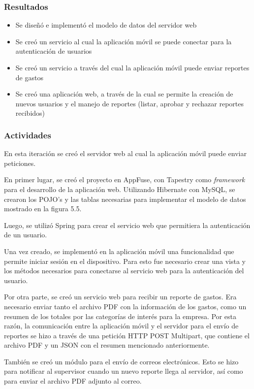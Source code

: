 \subsubsection{Resultados}
\begin{itemize}
\item Se diseñó e implementó el modelo de datos del servidor web
\item Se creó un servicio al cual la aplicación móvil se puede conectar para la autenticación de usuarios
\item Se creó un servicio a través del cual la aplicación móvil puede enviar reportes de gastos
\item Se creó una aplicación web, a través de la cual se permite la creación de nuevos usuarios y el manejo de reportes (listar, aprobar y rechazar reportes recibidos)
\end{itemize}

\subsubsection{Actividades}

En esta iteración se creó el servidor web al cual la aplicación móvil puede enviar peticiones.

En primer lugar, se creó el proyecto en AppFuse, con Tapestry como \textit{framework} para el desarrollo de la aplicación web. Utilizando Hibernate con MySQL, se crearon los POJO's y las tablas necesarias para implementar el modelo de datos mostrado en la figura 5.5.

Luego, se utilizó Spring para crear el servicio web que permitiera la autenticación de un usuario.

Una vez creado, se implementó en la aplicación móvil una funcionalidad que permite iniciar sesión en el dispositivo. Para esto fue necesario crear una vista y los métodos necesarios para conectarse al servicio web para la autenticación del usuario.

Por otra parte, se creó un servicio web para recibir un reporte de gastos. Era necesario enviar tanto el archivo PDF con la información de los gastos, como un resumen de los totales por las categorías de interés para la empresa. Por esta razón, la comunicación entre la aplicación móvil y el servidor para el envío de reportes se hizo a través de una petición HTTP POST Multipart, que contiene el archivo PDF y un JSON con el resumen mencionado anteriormente.

También se creó un módulo para el envío de correos electrónicos. Esto se hizo para notificar al supervisor cuando un nuevo reporte llega al servidor, así como para enviar el archivo PDF adjunto al correo.

